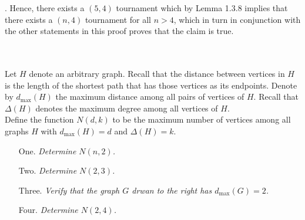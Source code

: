 \documentclass{article}
\begin{document}
{{\begin{center}
\end{center}.
	Hence, there exists a $(5,4)$ tournament which by Lemma 1.3.8 implies that there exists a $(n,4)$ tournament for all $n > 4$, which in turn in conjunction with the other statements in this proof proves that the claim is true.
	}
}
\noindent \underline{\hspace{5in}}\\[2em]
\noindent \maltese \hspace{1ex}{\bf Sub-Experience Two: An Optimization Problem}\\
\vspace{2em}
\noindent Let $H$ denote an arbitrary graph.  Recall that the distance between vertices in $H$ is the length of the shortest path that has those vertices as its endpoints.  Denote by $d_{\mathrm{max}}(H)$ the maximum distance among all pairs of vertices of $H$.  Recall that $\Delta(H)$ denotes the maximum degree among all vertices of $H$.\\
\noindent Define the function $N(d,k)$ to be the maximum number of vertices among all graphs $H$ with $d_{\mathrm{max}}(H) = d$ and $\Delta(H) = k$.\\
\begin{multicols}{2}
\begin{enumerate}
\item[One.] \emph{Determine $N(n,2)$.}
\item[Two.] \emph{Determine $N(2,3)$.}
\item[Three.] \emph{Verify that the graph $G$ drwan to the right has $d_{\mathrm{max}}(G) =2$.}
\item[Four.] \emph{Determine $N(2,4)$.}
\end{enumerate}
\end{multicols}
\end{document}
